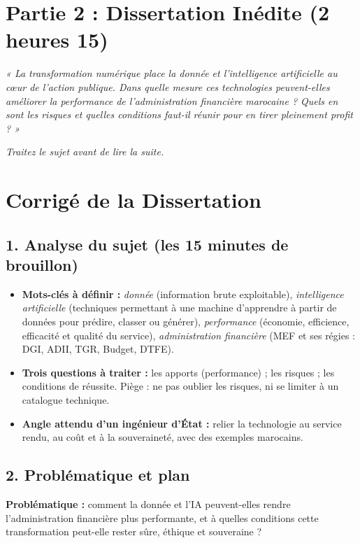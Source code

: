 \newpage
\section{Partie 2 : Dissertation Inédite (2 heures 15)}

\begin{tcolorbox}[colback=blue!5!white,colframe=blue!75!black,title=\textbf{Sujet inédit (examen blanc)}]
\textit{« La transformation numérique place la donnée et l'intelligence artificielle au cœur de l'action publique. Dans quelle mesure ces technologies peuvent-elles améliorer la performance de l'administration financière marocaine ? Quels en sont les risques et quelles conditions faut-il réunir pour en tirer pleinement profit ? »}
\end{tcolorbox}

\textit{Traitez le sujet avant de lire la suite.}

\newpage
\section{Corrigé de la Dissertation}

\subsection*{1. Analyse du sujet (les 15 minutes de brouillon)}
\begin{itemize}
    \item \textbf{Mots-clés à définir :} \textit{donnée} (information brute exploitable), \textit{intelligence artificielle} (techniques permettant à une machine d'apprendre à partir de données pour prédire, classer ou générer), \textit{performance} (économie, efficience, efficacité et qualité du service), \textit{administration financière} (MEF et ses régies : DGI, ADII, TGR, Budget, DTFE).
    \item \textbf{Trois questions à traiter :} les apports (performance) ; les risques ; les conditions de réussite. Piège : ne pas oublier les risques, ni se limiter à un catalogue technique.
    \item \textbf{Angle attendu d'un ingénieur d'État :} relier la technologie au service rendu, au coût et à la souveraineté, avec des exemples marocains.
\end{itemize}

\subsection*{2. Problématique et plan}
\textbf{Problématique :} comment la donnée et l'IA peuvent-elles rendre l'administration financière plus performante, et à quelles conditions cette transformation peut-elle rester sûre, éthique et souveraine ?

